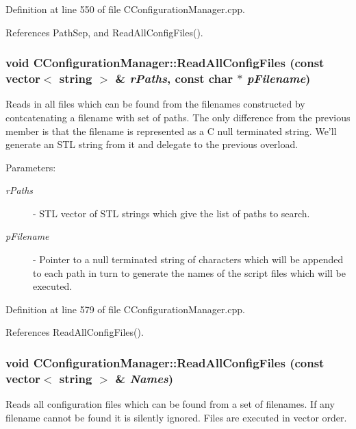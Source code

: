 Definition at line 550 of file CConfiguration\-Manager.cpp.

References Path\-Sep, and Read\-All\-Config\-Files().
\subsubsection{\setlength{\rightskip}{0pt plus 5cm}void CConfiguration\-Manager::Read\-All\-Config\-Files (const vector$<$ string $>$ \& {\em r\-Paths}, const char $\ast$ {\em p\-Filename})}\label{classCConfigurationManager_a18}


Reads in all files which can be found from the filenames constructed by contcatenating a filename with set of paths. The only difference from the previous member is that the filename is represented as a C null terminated string. We'll generate an STL string from it and delegate to the previous overload. \begin{Desc}
\item[Parameters: ]\par
\begin{description}
\item[{\em 
r\-Paths}]- STL vector of STL strings which give the list of paths to search. \item[{\em 
p\-Filename}]- Pointer to a null terminated string of characters which will be appended to each path in turn to generate the names of the script files which will be executed. \end{description}
\end{Desc}


Definition at line 579 of file CConfiguration\-Manager.cpp.

References Read\-All\-Config\-Files().
\subsubsection{\setlength{\rightskip}{0pt plus 5cm}void CConfiguration\-Manager::Read\-All\-Config\-Files (const vector$<$ string $>$ \& {\em Names})}\label{classCConfigurationManager_a17}


Reads all configuration files which can be found from a set of filenames. If any filename cannot be found it is silently ignored. Files are executed in vector order.

